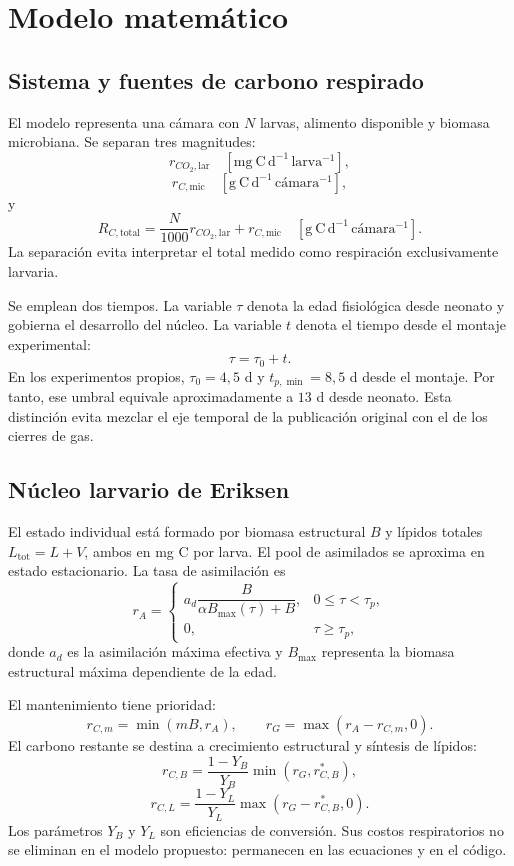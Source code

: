 \section{Modelo matemático}

\subsection{Sistema y fuentes de carbono respirado}

El modelo representa una cámara con $N$ larvas, alimento disponible y
biomasa microbiana. Se separan tres magnitudes:
\[
r_{CO_2,\mathrm{lar}}
\quad [\mathrm{mg\ C\,d^{-1}\,larva^{-1}}],
\]
\[
r_{C,\mathrm{mic}}
\quad [\mathrm{g\ C\,d^{-1}\,cámara^{-1}}],
\]
y
\[
R_{C,\mathrm{total}}
=\frac{N}{1000}r_{CO_2,\mathrm{lar}}
+r_{C,\mathrm{mic}}
\quad [\mathrm{g\ C\,d^{-1}\,cámara^{-1}}].
\]
La separación evita interpretar el total medido como respiración
exclusivamente larvaria.

Se emplean dos tiempos. La variable $\tau$ denota la edad fisiológica
desde neonato y gobierna el desarrollo del núcleo. La variable $t$
denota el tiempo desde el montaje experimental:
\[
\tau=\tau_0+t.
\]
En los experimentos propios, $\tau_0=4{,}5$ d y
$t_{p,\min}=8{,}5$ d desde el montaje. Por tanto, ese umbral equivale
aproximadamente a $13$ d desde neonato. Esta distinción evita mezclar
el eje temporal de la publicación original con el de los cierres de gas.

\subsection{Núcleo larvario de Eriksen}

El estado individual está formado por biomasa estructural $B$ y lípidos
totales $L_{\mathrm{tot}}=L+V$, ambos en mg C por larva. El pool de
asimilados se aproxima en estado estacionario. La tasa de asimilación
es
\[
r_A=
\begin{cases}
a_d\dfrac{B}{\alpha B_{\max}(\tau)+B},
&0\leq\tau<\tau_p,\\[6pt]
0,&\tau\geq\tau_p,
\end{cases}
\]
donde $a_d$ es la asimilación máxima efectiva y $B_{\max}$ representa
la biomasa estructural máxima dependiente de la edad.

El mantenimiento tiene prioridad:
\[
r_{C,m}=\min(mB,r_A),
\qquad
r_G=\max(r_A-r_{C,m},0).
\]
El carbono restante se destina a crecimiento estructural y síntesis de
lípidos:
\[
r_{C,B}=\frac{1-Y_B}{Y_B}\min(r_G,r_{C,B}^{*}),
\]
\[
r_{C,L}=\frac{1-Y_L}{Y_L}\max(r_G-r_{C,B}^{*},0).
\]
Los parámetros $Y_B$ y $Y_L$ son eficiencias de conversión. Sus costos
respiratorios no se eliminan en el modelo propuesto: permanecen en las
ecuaciones y en el código.

